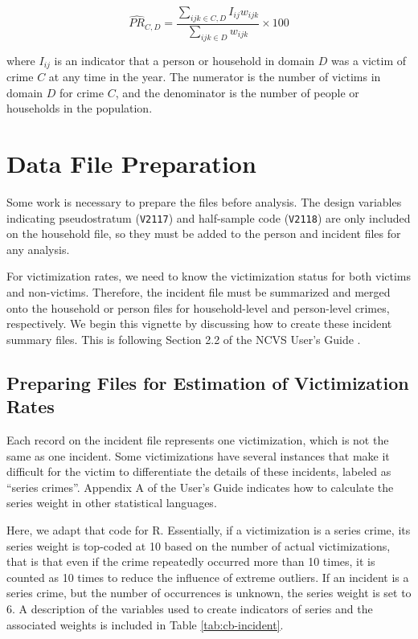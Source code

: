 \documentclass[
]{krantz}
\begin{document}
\[ \hat{PR}_{C, D}= \frac{\sum_{ijk \in {C,D}} I_{ij}w_{ijk}}{\sum_{ijk \in D} w_{ijk}} \times 100\]

where \(I_{ij}\) is an indicator that a person or household in domain \(D\) was a victim of crime \(C\) at any time in the year. The numerator is the number of victims in domain \(D\) for crime \(C\), and the denominator is the number of people or households in the population.

\hypertarget{data-file-preparation}{%
\section{Data File Preparation}\label{data-file-preparation}}

Some work is necessary to prepare the files before analysis. The design variables indicating pseudostratum (\texttt{V2117}) and half-sample code (\texttt{V2118}) are only included on the household file, so they must be added to the person and incident files for any analysis.

For victimization rates, we need to know the victimization status for both victims and non-victims. Therefore, the incident file must be summarized and merged onto the household or person files for household-level and person-level crimes, respectively. We begin this vignette by discussing how to create these incident summary files. This is following Section 2.2 of the NCVS User's Guide \citep{ncvs_user_guide}.

\hypertarget{preparing-files-for-estimation-of-victimization-rates}{%
\subsection{Preparing Files for Estimation of Victimization Rates}\label{preparing-files-for-estimation-of-victimization-rates}}

Each record on the incident file represents one victimization, which is not the same as one incident. Some victimizations have several instances that make it difficult for the victim to differentiate the details of these incidents, labeled as ``series crimes''. Appendix A of the User's Guide indicates how to calculate the series weight in other statistical languages.

Here, we adapt that code for R. Essentially, if a victimization is a series crime, its series weight is top-coded at 10 based on the number of actual victimizations, that is that even if the crime repeatedly occurred more than 10 times, it is counted as 10 times to reduce the influence of extreme outliers. If an incident is a series crime, but the number of occurrences is unknown, the series weight is set to 6. A description of the variables used to create indicators of series and the associated weights is included in Table \ref{tab:cb-incident}.
\end{document}
